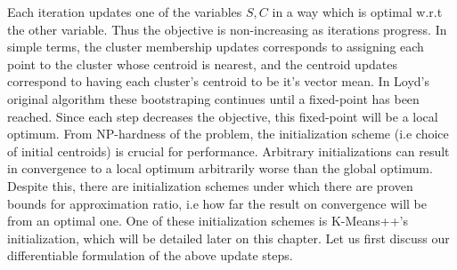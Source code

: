 Each iteration updates one of the variables $S,C$ in a way which is optimal w.r.t the other variable. Thus the objective is non-increasing as iterations progress.
In simple terms, the cluster membership updates corresponds to assigning each point to the cluster whose centroid is nearest, and the centroid updates correspond to having each cluster's centroid to be it's vector mean.
In Loyd's original algorithm these bootstraping continues until a fixed-point has been reached. Since each step decreases the objective, this fixed-point will be a local optimum. 
From NP-hardness of the problem, the initialization scheme (i.e choice of initial centroids) is crucial for performance. Arbitrary initializations can result in convergence to a local optimum arbitrarily worse than the global optimum. Despite this, there are initialization schemes under which there are proven bounds for approximation ratio, i.e how far the result on convergence will be from an optimal one. One of these initialization schemes is K-Means++'s initialization, which will be detailed later on this chapter. 
Let us first discuss our differentiable formulation of the above update steps.
